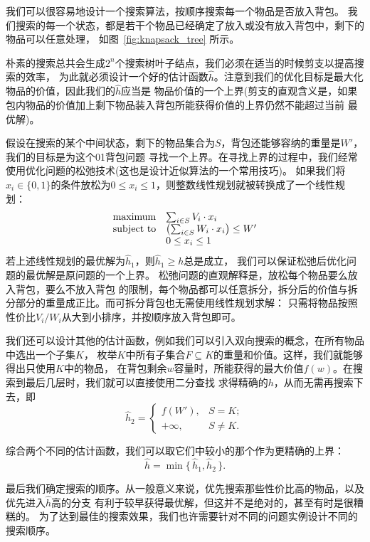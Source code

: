 \begin{solution}
 我们可以很容易地设计一个搜索算法，按顺序搜索每一个物品是否放入背包。
 我们搜索的每一个状态，都是若干个物品已经确定了放入或没有放入背包中，剩下的物品可以任意处理，
 如图~\ref{fig:knapsack_tree} 所示。

 

 朴素的搜索总共会生成$2^n$个搜索树叶子结点，我们必须在适当的时候剪支以提高搜索的效率，
 为此就必须设计一个好的估计函数$\hat{h}$。注意到我们的优化目标是最大化物品的价值，因此我们的$\hat h$应当是
 物品价值的一个上界(剪支的直观含义是，如果包内物品的价值加上剩下物品装入背包所能获得价值的上界仍然不能超过当前
 最优解)。

 假设在搜索的某个中间状态，剩下的物品集合为$S$，背包还能够容纳的重量是$W'$，我们的目标是为这个01背包问题
 寻找一个上界。在寻找上界的过程中，我们经常使用优化问题的松弛技术(这也是设计近似算法的一个常用技巧)。
 如果我们将$x_i\in\{0,1\}$的条件放松为$0\le x_i\le 1$，则整数线性规划就被转换成了一个线性规划：
 $$\begin{array}{rl}
  {\rm maximum}     & \sum_{i\in S} V_i\cdot x_i \\
  {\rm subject\ to} & \left( \sum_{i\in S} W_i\cdot x_i \right) \leq W' \\
                   & 0\leq x_i \leq 1\\
   \end{array}
 $$
 若上述线性规划的最优解为$\hat h_1$，则$\hat h_1\ge h$总是成立，
  我们可以保证松弛后优化问题的最优解是原问题的一个上界。
 松弛问题的直观解释是，放松每个物品要么放入背包，要么不放入背包
 的限制，每个物品都可以任意拆分，拆分后的价值与拆分部分的重量成正比。而可拆分背包也无需使用线性规划求解：
 只需将物品按照性价比$V_i / W_i$从大到小排序，并按顺序放入背包即可。

 我们还可以设计其他的估计函数，例如我们可以引入双向搜索的概念，在所有物品中选出一个子集$K$，
 枚举$K$中所有子集合$F\subseteq K$的重量和价值。这样，我们就能够得出只使用$K$中的物品，
 在背包剩余$w$容量时，所能获得的最大价值$f(w)$。在搜索到最后几层时，我们就可以直接使用二分查找
 求得精确的$h$，从而无需再搜索下去，即
 $$\hat h_2 = \begin{cases}
  f(W'), & S = K; \\
  +\infty,    & S\neq K.
  \end{cases}
 $$

 综合两个不同的估计函数，我们可以取它们中较小的那个作为更精确的上界：
 $$\hat h=\min \big\{\,\hat h_1, \hat h_2\,\big\}.$$

 最后我们确定搜索的顺序。从一般意义来说，优先搜索那些性价比高的物品，以及优先进入$\hat{h}$高的分支
 有利于较早获得最优解，但这并不是绝对的，甚至有时是很糟糕的。
 为了达到最佳的搜索效果，我们也许需要针对不同的问题实例设计不同的搜索顺序。
\end{solution}


